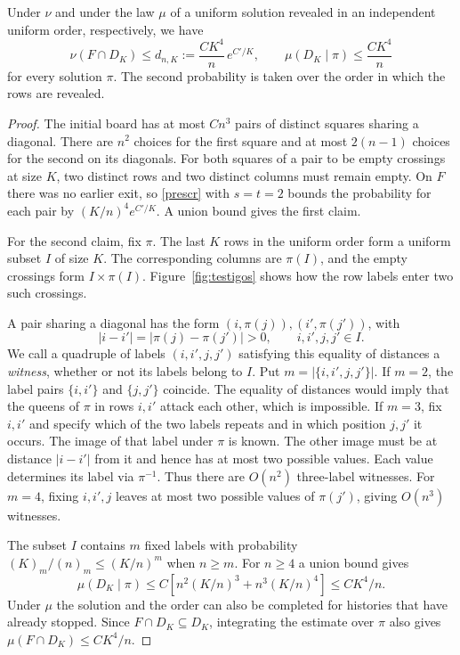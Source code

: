 \begin{lema}\label{terminal-geometria}
Under $\nu$ and under the law $\mu$ of a uniform solution revealed in an independent uniform order,
respectively, we have
\[
 \nu(F\cap D_K)\le d_{n,K}:=\frac{C K^4}{n}\,e^{C'/K},
 \qquad \mu(D_K\mid\pi)\le \frac{C K^4}{n}
\]
for every solution $\pi$. The second probability is taken over the order in which the rows
are revealed.
\end{lema}
\begin{proof}
The initial board has at most $Cn^3$ pairs of distinct squares sharing a diagonal. There are
$n^2$ choices for the first square and at most $2(n-1)$ choices for the second on its diagonals.
For both squares of a pair to be empty crossings at size $K$, two distinct rows and two distinct
columns must remain empty. On $F$ there was no earlier exit, so \eqref{prescr} with $s=t=2$
bounds the probability for each pair by $(K/n)^4e^{C'/K}$. A union bound gives the first claim.

For the second claim, fix $\pi$. The last $K$ rows in the uniform order form a uniform subset $I$
of size $K$. The corresponding columns are $\pi(I)$, and the empty crossings form $I\times\pi(I)$.
Figure~\ref{fig:testigos} shows how the row labels enter two such crossings.


A pair sharing a diagonal has the form $(i,\pi(j)),(i',\pi(j'))$, with
\[
 |i-i'|=|\pi(j)-\pi(j')|>0,\qquad i,i',j,j'\in I.
\]
We call a quadruple of labels $(i,i',j,j')$ satisfying this equality of distances a \emph{witness},
whether or not its labels belong to $I$. Put $m=|\{i,i',j,j'\}|$. If $m=2$, the label pairs
$\{i,i'\}$ and $\{j,j'\}$ coincide. The equality of distances would imply that the queens of
$\pi$ in rows $i,i'$ attack each other, which is impossible. If $m=3$, fix $i,i'$ and specify
which of the two labels repeats and in which position $j,j'$ it occurs. The image of that label
under $\pi$ is known. The other image must be at distance $|i-i'|$ from it and hence has at most
two possible values. Each value determines its label via $\pi^{-1}$. Thus there are $O(n^2)$
three-label witnesses. For $m=4$, fixing $i,i',j$ leaves at most two possible values of $\pi(j')$,
giving $O(n^3)$ witnesses.

The subset $I$ contains $m$ fixed labels with probability $(K)_m/(n)_m\le(K/n)^m$ when $n\ge m$.
For $n\ge4$ a union bound gives
\[
 \mu(D_K\mid\pi)\le C\left[n^2(K/n)^3+n^3(K/n)^4\right]\le CK^4/n.
\]
Under $\mu$ the solution and the order can also be completed for histories that have already
stopped. Since $F\cap D_K\subseteq D_K$, integrating the estimate over $\pi$ also gives
$\mu(F\cap D_K)\le CK^4/n$.
\end{proof}
